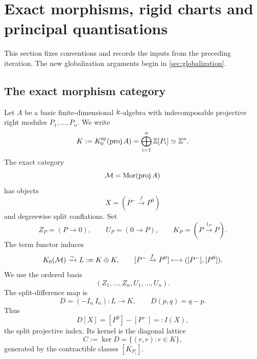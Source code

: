 \section{Exact morphisms, rigid charts and principal quantisations}
\label{sec:setup}

This section fixes conventions and records the inputs from the preceding
iteration.  The new globalization arguments begin in \cref{sec:globalization}.

\subsection{The exact morphism category}

Let $A$ be a basic finite-dimensional $k$-algebra with indecomposable
projective right modules $P_1,\ldots,P_n$.  We write
\[
 K:=K_0^{\mathrm{sp}}(\operatorname{proj} A)
   =\bigoplus_{i=1}^n\mathbb Z[P_i]
 \simeq\mathbb Z^n.
\]
The exact category
\[
 \mathcal M=\operatorname{Mor}(\operatorname{proj} A)
\]
has objects
\[
 X=(P^-\xrightarrow fP^0)
\]
and degreewise split conflations.  Set
\[
 Z_P=(P\longrightarrow0),
 \qquad
 U_P=(0\longrightarrow P),
 \qquad
 K_P=(P\xrightarrow{1_P}P).
\]
The term functor induces
\begin{equation}
 K_0(\mathcal M)\xrightarrow{\sim}L:=K\oplus K,
 \qquad
 [P^-\xrightarrow fP^0]\longmapsto([P^-],[P^0]).
 \label{eq:term-lattice}
\end{equation}
We use the ordered basis
\[
 (Z_1,\ldots,Z_n,U_1,\ldots,U_n).
\]
The split-difference map is
\begin{equation}
 D=(-I_n\ I_n):L\longrightarrow K,
 \qquad
 D(p,q)=q-p.
 \label{eq:D-map}
\end{equation}
Thus
\[
 D[X]=[P^0]-[P^-]=:I(X),
\]
the split projective index.  Its kernel is the diagonal lattice
\begin{equation}
 C:=\ker D=\{(r,r):r\in K\},
 \label{eq:contractible-lattice}
\end{equation}
generated by the contractible classes $[K_{P_i}]$.

